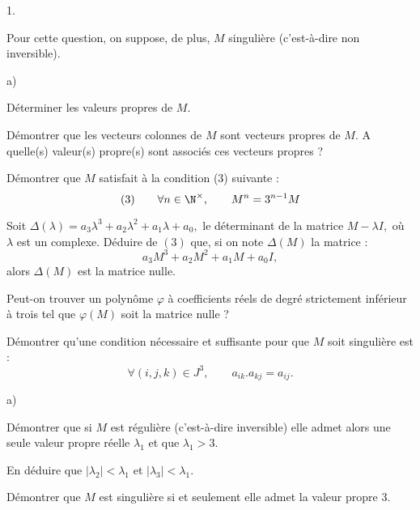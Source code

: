 \documentclass[11pt]{article}%
\begin{document}
\begin{noliste}{1.}
 \setlength{\itemsep}{4mm}
\item Pour cette question, on suppose, de plus, $M$ singulière
(c'est-à-dire
non inversible).

\begin{noliste}{a)}
 \setlength{\itemsep}{2mm}
\item Déterminer les valeurs propres de $M.$

\item Démontrer que les vecteurs colonnes de $M$ sont vecteurs propres
de $M.
$ A quelle(s) valeur(s) propre(s) sont associés ces vecteurs propres ?

\item Démontrer que $M$ satisfait à la condition (3) suivante :
\[
(3)\qquad \forall n\in \N^{\times },\qquad M^{n} = 3^{n-1}M
\]

\item Soit $\Delta (\lambda ) = a_{3}\lambda ^{3} + a_{2}\lambda
^{2} + a_{1}\lambda + a_{0},$ le déterminant de la matrice $M-\lambda
I,$ où $\lambda $ est un complexe. Déduire de $(3)$ que, si on note
$\Delta (M)$ la
matrice : 
\[
a_{3}M^{3} + a_{2}M^{2} + a_{1}M + a_{0}I,
\]
alors $\Delta (M)$ est la matrice nulle.

\item Peut-on trouver un polynôme $\varphi $ à coefficients réels de
degré
strictement inférieur à trois tel que $\varphi (M)$ soit la matrice
nulle ?
\end{noliste}

\item Démontrer qu'une condition nécessaire et suffisante pour que $M$
soit
singulière est :
\[
\forall (i,j,k)\in J^{3},\qquad a_{ik}.a_{kj} = a_{ij}.
\]

\item 

\begin{noliste}{a)}
 \setlength{\itemsep}{2mm}
\item Démontrer que si $M$ est régulière (c'est-à-dire inversible) elle
admet alors une seule valeur propre réelle $\lambda_{1}$ et que
$\lambda
_{1}>3.$

\item En déduire que $\left| \lambda_{2}\right| <\lambda_{1}$ et
$\left| \lambda_{3}\right| <\lambda_{1}.$
\end{noliste}

\item Démontrer que $M$ est singulière si et seulement elle admet la
valeur
propre $3.$
\end{noliste}
\end{document}
